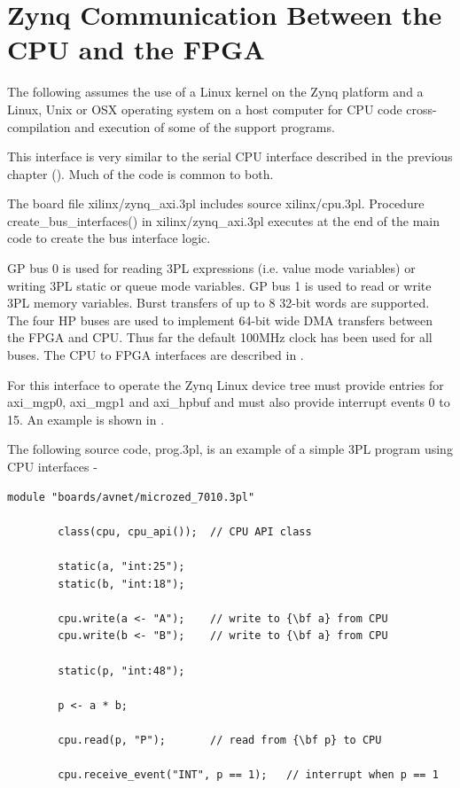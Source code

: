 \pagebreak

\chapter{Zynq Communication Between the CPU and the FPGA}\label{ch:zynqcpu}

    The following assumes the use of a Linux kernel on the Zynq platform and a
    Linux, Unix or OSX operating system on a host computer for CPU code
    cross-compilation and execution of some of the support programs.
    
    This interface is very similar to the serial CPU interface described in the
    previous chapter (). Much of the code is common to
    both.

    The board file xilinx/zynq\_axi.3pl includes source xilinx/cpu.3pl.
    Procedure create\_bus\_interfaces() in xilinx/zynq\_axi.3pl executes at the
    end of the main code to create the bus interface logic.

    GP bus 0 is used for reading 3PL expressions (i.e. value mode variables) or
    writing 3PL static or queue mode variables. GP bus 1 is used to read or
    write 3PL memory variables. Burst transfers of up to 8 32-bit words are
    supported. The four HP buses are used to implement 64-bit wide DMA transfers
    between the FPGA and CPU. Thus far the default 100MHz clock has been used
    for all buses. The CPU to FPGA interfaces are described in
    .
    
    For this interface to operate the Zynq Linux device tree must provide
    entries for axi\_mgp0, axi\_mgp1 and axi\_hpbuf and must also provide
    interrupt events 0 to 15. An example is shown in
    .
    
    The following source code, prog.3pl, is an example of a simple 3PL program
    using CPU interfaces -
    
    \begin{lstlisting}[gobble=4, language=threepl]
        module "boards/avnet/microzed_7010.3pl"
        
        class(cpu, cpu_api());  // CPU API class

        static(a, "int:25");
        static(b, "int:18");

        cpu.write(a <- "A");    // write to {\bf a} from CPU
        cpu.write(b <- "B");    // write to {\bf a} from CPU

        static(p, "int:48");

        p <- a * b;

        cpu.read(p, "P");       // read from {\bf p} to CPU

        cpu.receive_event("INT", p == 1);   // interrupt when p == 1
    \end{lstlisting}
    
